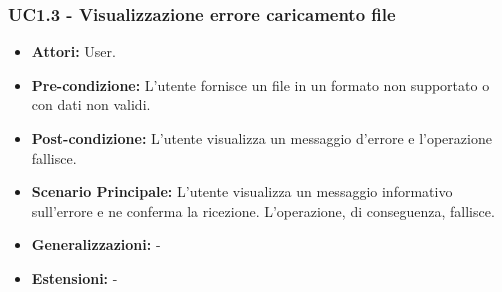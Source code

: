 \subsubsection{UC1.3 - Visualizzazione errore caricamento file}
\begin{itemize}
    \item \textbf{Attori:} User.
    \item \textbf{Pre-condizione:} L'utente fornisce un file in un formato non supportato o con dati non validi.
    \item \textbf{Post-condizione:} L'utente visualizza un messaggio d'errore e l'operazione fallisce.
    \item \textbf{Scenario Principale:}  L'utente visualizza un messaggio informativo sull'errore e ne conferma la ricezione. L'operazione, di conseguenza, fallisce.
    \item \textbf{Generalizzazioni:} -
    \item \textbf{Estensioni:} -
\end{itemize}